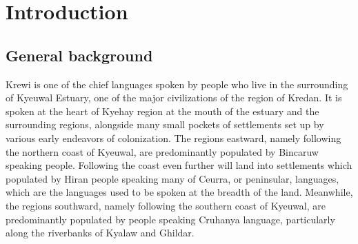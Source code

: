 \section{Introduction}%
\subsection{General background}%

Krewi is one of the chief languages spoken by people who live in the surrounding of Kyeuwal Estuary, one of the major civilizations of the region of Kredan. It is spoken at the heart of Kyehay region at the mouth of the estuary and the surrounding regions, alongside many small pockets of settlements set up by various early endeavors of colonization. The regions eastward, namely following the northern coast of Kyeuwal, are predominantly populated by Bincaruw speaking people. Following the coast even further will land into settlements which populated by Hiran people speaking many of Ceurra, or peninsular, languages, which are the languages used to be spoken at the breadth of the land. Meanwhile, the regions southward, namely following the southern coast of Kyeuwal, are predominantly populated by people speaking Cruhanya language, particularly along the riverbanks of Kyalaw and Ghildar.



